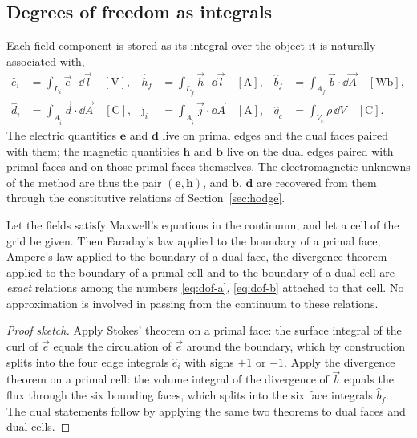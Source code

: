 \subsection{Degrees of freedom as integrals}

Each field component is stored as its integral over the object it is naturally associated with,
\begin{align}
  \hat e_i &= \int_{L_i} \vec e\cdot\dd\vec l \quad [\mathrm{V}], &
  \hat h_f &= \int_{L_{\tilde f}} \vec h\cdot\dd\vec l \quad [\mathrm{A}], &
  \hat b_f &= \int_{A_f} \vec b\cdot\dd\vec A \quad [\mathrm{Wb}], \label{eq:dof-a}\\[2pt]
  \hat d_i &= \int_{A_{\tilde i}} \vec d\cdot\dd\vec A \quad [\mathrm{C}], &
  \hat\jmath_i &= \int_{A_{\tilde i}} \vec j\cdot\dd\vec A \quad [\mathrm{A}], &
  \hat q_c &= \int_{V_c} \rho\,\dd V \quad [\mathrm{C}]. \label{eq:dof-b}
\end{align}
The electric quantities $\mathbf{e}$ and $\mathbf{d}$ live on primal edges and the dual faces paired with them; the
magnetic quantities $\mathbf{h}$ and $\mathbf{b}$ live on the dual edges paired with primal faces and on those
primal faces themselves. The electromagnetic unknowns of the method are thus the pair $(\mathbf{e},\mathbf{h})$,
and $\mathbf{b}$, $\mathbf{d}$ are recovered from them through the constitutive relations of
Section~\ref{sec:hodge}.

\begin{proposition}
\label{prop:exactness}
Let the fields satisfy Maxwell's equations in the continuum, and let a cell of the grid be given. Then Faraday's
law applied to the boundary of a primal face, Ampere's law applied to the boundary of a dual face, the divergence
theorem applied to the boundary of a primal cell and to the boundary of a dual cell are \emph{exact} relations
among the numbers \eqref{eq:dof-a}, \eqref{eq:dof-b} attached to that cell. No approximation is involved in
passing from the continuum to these relations.
\end{proposition}

\begin{proof}[Proof sketch]
Apply Stokes' theorem on a primal face: the surface integral of the curl of $\vec e$ equals the circulation of
$\vec e$ around the boundary, which by construction splits into the four edge integrals $\hat e_i$ with signs
$+1$ or $-1$. Apply the divergence theorem on a primal cell: the volume integral of the divergence of $\vec b$
equals the flux through the six bounding faces, which splits into the six face integrals $\hat b_f$. The dual
statements follow by applying the same two theorems to dual faces and dual cells.
\end{proof}

